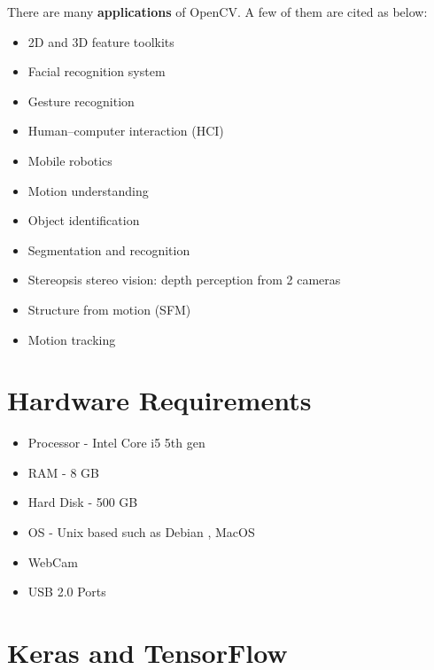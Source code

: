 There are many \textbf{applications} of OpenCV. A few of them are cited as below:
\begin{itemize}
\item 2D and 3D feature toolkits 
\item Facial recognition system 
\item Gesture recognition 
\item Human–computer interaction (HCI) 
\item Mobile robotics 
\item Motion understanding 
\item Object identification 
\item Segmentation and recognition 
\item Stereopsis stereo vision: depth perception from 2 cameras 
\item Structure from motion (SFM) 
\item Motion tracking 
\end{itemize}
\section{Hardware Requirements}
\begin{itemize}
	\item Processor - Intel Core i5 5th gen
	\item RAM - 8 GB
	\item Hard Disk - 500 GB
	\item OS - Unix based such as Debian , MacOS
	\item WebCam
	\item USB 2.0 Ports
\end{itemize}
\section{Keras and TensorFlow}
